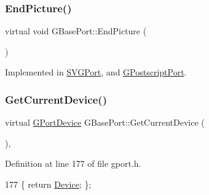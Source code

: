 \mbox{\label{class_g_base_port_ac14e5cf72682662f8ac24c57e98b1bfa}} 
\subsubsection{\texorpdfstring{End\+Picture()}{EndPicture()}}
{\footnotesize\ttfamily virtual void G\+Base\+Port\+::\+End\+Picture (\begin{DoxyParamCaption}{ }\end{DoxyParamCaption})\hspace{0.3cm}{\ttfamily [pure virtual]}}



Implemented in \mbox{\hyperlink{class_s_v_g_port_a564266843879b682d84b9aefad185662}{S\+V\+G\+Port}}, and \mbox{\hyperlink{class_g_postscript_port_afae4057295ef049fac22ce97eecb7d7f}{G\+Postscript\+Port}}.

\mbox{\label{class_g_base_port_aeca5105700149693465fb5dbc43c9bbc}} 
\subsubsection{\texorpdfstring{Get\+Current\+Device()}{GetCurrentDevice()}}
{\footnotesize\ttfamily virtual \mbox{\hyperlink{gport_8h_a595e501a3b83fde14c760260fbfb153f}{G\+Port\+Device}} G\+Base\+Port\+::\+Get\+Current\+Device (\begin{DoxyParamCaption}{ }\end{DoxyParamCaption})\hspace{0.3cm}{\ttfamily [inline]}, {\ttfamily [virtual]}}



Definition at line 177 of file gport.\+h.


\begin{DoxyCode}
177 \{ \textcolor{keywordflow}{return} \mbox{\hyperlink{class_g_base_port_a14275a027c8665d5fa4941e148a1b46a}{Device}}; \};
\end{DoxyCode}
\mbox{\label{class_g_base_port_a2d6dd3aa5ad82b26ed614e139c2f6b8f}} 
